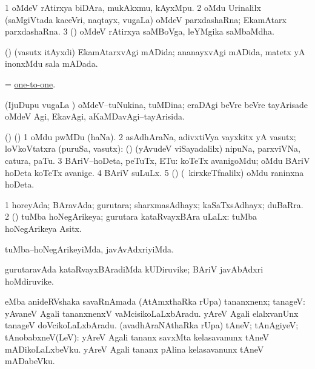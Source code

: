 \bentry
{}
\gl{\nA}
\bmng
\bnum
\num{1} oMdeV rAtirxya biDAra, mukAkxmu, kAyxMpu. 
\num{2} oMdu Urinalilx (saMgiVtada kaceVri, naqtayx, \mo vugaLa) oMdeV parxdashaRna; EkamAtarx parxdashaRna. 
\num{3} (\AmA) oMdeV rAtirxya saMBoVga, leYMgika saMbaMdha. 
\enum
\emng
\eentry

\bentry
{}
\gl{\gu}
\bmng
(\AmA) (vasutx itAyxdi) EkamAtarxvAgi mADida; ananayxvAgi mADida, matetx yA inonxMdu sala mADada. 
\emng
\eentry

\bentry
{}
\gl{\gu}
\bmng
= \hyperlink{one-to-one}{one-to-one}. 
\emng
\eentry

\bentry
{}
\gl{\gu}
\bmng
(IjuDupu \mo vugaLa \vi) oMdeV--tuNukina, tuMDina; eraDAgi beVre beVre tayArisade oMdeV Agi, EkavAgi, aKaMDavAgi--tayArisida. 
\emng
\eentry

\bentry
{}
\gl{\nA}
\bmng
(\birx) (\ashi) 
\bnum
\num{1} oMdu pwMDu (haNa). 
\num{2} asAdhAraNa, adivxtiVya vayxkitx yA vasutx; loVkoVtatxra (puruSa, vasutx):  (\ashi) (yAvudeV viSayadalilx) nipuNa, parxviVNa, catura, paTu. 
\num{3} BAriV--hoDeta, peTuTx, ETu:  koTeTx avanigoMdu; oMdu BAriV hoDeta koTeTx avanige. 
\num{4} BAriV suLuLx. 
\num{5} (\AmA) (\kanmu\ kirxkeTfnalilx) oMdu raninxna hoDeta. 
\enum
\emng
\eentry

\bentry
{}
\gl{\gu}
\bmng
\bnum
\num{1} horeyAda; BAravAda; gurutara; sharxmasAdhayx; kaSaTxsAdhayx; duBaRra. 
\num{2} (\nAyxshA) tuMba hoNegArikeya; gurutara kataRvayxBAra uLaLx:  tuMba hoNegArikeya Asitx. 
\enum
\emng
\eentry

\bentry
{}
\gl{\kirxvi}
\bmng
tuMba--hoNegArikeyiMda, javAvAdxriyiMda. 
\emng
\eentry

\bentry
{}
\gl{\nA}
\bmng
gurutaravAda kataRvayxBAradiMda kUDiruvike; BAriV javAbAdxri hoMdiruvike. 
\emng
\eentry

\bentry
{}
\gl{\sanA}
\bmng
{} eMba anideRVshaka savaRnAmada 
\banum
{} (AtAmxthaRka rUpa) tananxnenx; tanageV:  yAvaneV Agali tananxnenxV vaMcisikoLaLxbAradu.  yAreV Agali elalxvanUnx tanageV doVcikoLaLxbAradu. 
 (avadhAraNAthaRka rUpa) tAneV; tAnAgiyeV; tAnobabxneV(LeV):  yAreV Agali tananx savxMta kelasavanunx tAneV mADikoLaLxbeVku.  yAreV Agali tananx pAlina kelasavanunx tAneV mADabeVku. 
\eanum
\emng
\eentry

